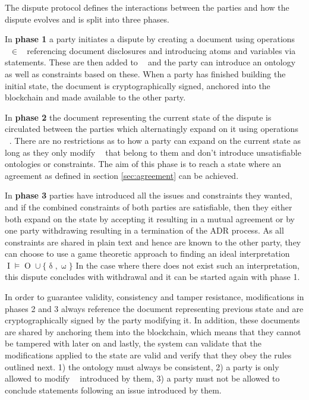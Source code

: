 \documentclass[12pt,msc,a4paper,oneside]{ucl_thesis}
\DeclareMathOperator{\Metalang}{\mathcal{L}_m}
\DeclareMathOperator{\metaop}{\mathcal{o}_m}
\DeclareMathOperator{\Proplang}{\mathcal{L}(N)}
\DeclareMathOperator{\Interpretation}{I}
\DeclareMathOperator{\Ontology}{O}
\DeclareMathOperator{\demand}{\delta}
\DeclareMathOperator{\offer}{\omega}
\begin{document}
The dispute protocol defines the interactions between the parties and how the dispute evolves and is split into three phases.

In \textbf{phase 1} a party initiates a dispute by creating a document using operations $\metaop \in \Metalang$ referencing document disclosures and introducing atoms and variables via statements. These are then added to $\Proplang$ and the party can introduce an ontology as well as constraints based on these. When a party has finished building the initial state, the document is cryptographically signed, anchored into the blockchain and made available to the other party.

In \textbf{phase 2} the document representing the current state of the dispute is circulated between the parties which alternatingly expand on it using operations $\metaop$. There are no restrictions as to how a party can expand on the current state as long as they only modify $\metaop$ that belong to them and don't introduce unsatisfiable ontologies or constraints. The aim of this phase is to reach a state where an agreement as defined in section \ref{sec:agreement} can be achieved.

In \textbf{phase 3} parties have introduced all the issues and constraints they wanted, and if the combined constraints of both parties are satisfiable, then they either both expand on the state by accepting it resulting in a mutual agreement or by one party withdrawing resulting in a termination of the ADR process. As all constraints are shared in plain text and hence are known to the other party, they can choose to use a game theoretic approach to finding an ideal interpretation $\Interpretation \models \Ontology \cup \{\demand, \offer\}$ In the case where there does not exist such an interpretation, this dispute concludes with  withdrawal and it can be started again with phase 1.

In order to guarantee validity, consistency and tamper resistance, modifications in phases 2 and 3 always reference the document representing previous state and are cryptographically signed by the party modifying it. In addition, these documents are shared by anchoring them into the blockchain, which means that they cannot be tampered with later on and lastly, the system can validate that the modifications applied to the state are valid and verify that they obey the rules outlined next. 1) the ontology must always be consistent, 2) a party is only allowed to modify $\metaop$ introduced by them, 3) a party must not be allowed to conclude statements following an issue introduced by them. 
\end{document}
